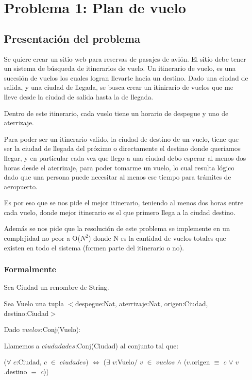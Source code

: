 \section{Problema 1: Plan de vuelo}

\subsection{Presentación del problema}

Se quiere crear un sitio web para reservas de pasajes de avi\'on. El sitio debe tener un sistema de b\'usqueda de itinerarios de vuelo. Un itinerario de vuelo, es una sucesi\'on de vuelos los cuales logran llevarte hacia un destino. Dado una ciudad de salida, y una ciudad de llegada, se busca crear un itinirario de vuelos que me lleve desde la ciudad de salida hasta la de llegada.

Dentro de este itinerario, cada vuelo tiene un horario de despegue y uno de aterrizaje. 

Para poder ser un itinerario valido, la ciudad de destino de un vuelo, tiene que ser la ciudad de llegada del pr\'oximo o directamente el destino donde queriamos llegar, y en particular cada vez que llego a una ciudad debo esperar al menos dos horas desde el aterrizaje, para poder tomarme un vuelo, lo cual resulta l\'ogico dado que una persona puede necesitar al menos ese tiempo para tr\'amites de aeropuerto.

Es por eso que se nos pide el mejor itinerario, teniendo al menos dos horas entre cada vuelo, donde mejor itinerario es el que primero llega a la ciudad destino.

Adem\'as se nos pide que la resoluci\'on de este problema se implemente en un complejidad no peor a O($N^{2}$) donde N es la cantidad de vuelos totales que existen en todo el sistema (formen parte del itinerario o no).

\newpage
\subsubsection{Formalmente}


Sea Ciudad un renombre de String.

Sea Vuelo una tupla $<$despegue:Nat, aterrizaje:Nat, origen:Ciudad, destino:Ciudad$>$

Dado $vuelos$:Conj(Vuelo):

Llamemos a $ciudadades$:Conj(Ciudad) al conjunto tal que:

($\forall$ $c$:Ciudad, $c$ $\in$ $ciudades$)  $\Leftrightarrow$ ($\exists$ $v$:Vuelo$/$ $v$ $\in$ $vuelos$ $\wedge$ ($v$.origen $\equiv$ $c$ $\vee$ $v$.destino $\equiv$ $c$))

